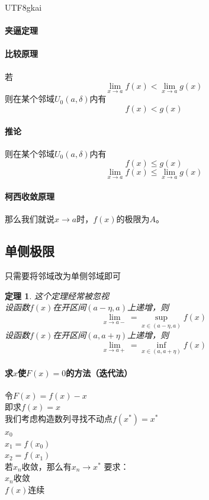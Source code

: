 \documentclass{article}
\newtheorem{theorem}{定理}[subsection]
\begin{document}
\begin{CJK}{UTF8}{gkai}
\paragraph{夹逼定理\\}
\paragraph{比较原理\\}
若
\[\lim_{x\to a} f(x)<\lim_{x\to a} g(x)\]
则在某个邻域$U_0(a,\delta)$内有
\[f(x)<g(x)\]

\paragraph{推论\\}
则在某个邻域$U_0(a,\delta)$内有
\[f(x)\leq g(x)\]
\[\lim_{x\to a} f(x)\leq \lim_{x\to a} g(x)\]
\paragraph{柯西收敛原理\\}
那么我们就说$x\to a $时，$f(x)$的极限为$A$。
\subsection{单侧极限}
只需要将邻域改为单侧邻域即可\\
\begin{theorem}
这个定理经常被忽视\\
设函数$f(x)$在开区间$(a-\eta,a)$上递增，则
\[\lim_{x\to a-}=\sup_{x\in (a-\eta,a)}f(x)\]
设函数$f(x)$在开区间$(a,a+\eta)$上递增，则
\[\lim_{x\to a+}=\inf_{x\in (a,a+\eta)}f(x)\]
\end{theorem}
\paragraph{求$x$使$F(x)=0$的方法（迭代法）\\}
令$F(x)=f(x)-x$\\
即求$f(x)=x$\\
我们考虑构造数列寻找不动点$f(x^*)=x^*$\\
$x_0$\\
$x_1=f(x_0)$\\
$x_2=f(x_1)$\\
若$x_n$收敛，那么有$x_n\to x^*$
要求：\\
${x_n}$收敛\\
$f(x)$连续\\

\newpage

\end{CJK}
\end{document}
